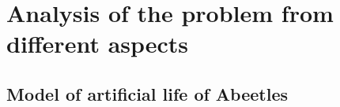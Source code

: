 \documentclass[a4paper,12pt]{report}
\begin{document}
 






\chapter{Analysis of the problem from different aspects}%


\section {Model of artificial life of Abeetles}
\end{document}
